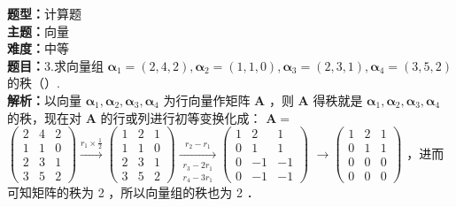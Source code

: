 \documentclass{ctexart}
\newenvironment{question}[5]{%
	\noindent\textbf{题型：}#1\\
	\textbf{主题：}#2\\
	\textbf{难度：}#3\\
	\textbf{题目：}#4\\
	\textbf{解析：}#5\\
	\vspace{1em}
}{}
\begin{document}
	\begin{question}
		{计算题}
		{向量}
		{中等}
		{3.求向量组 \(\boldsymbol{\alpha}_1=(2,4,2), \boldsymbol{\alpha}_2=(1,1,0), \boldsymbol{\alpha}_3=(2,3,1), \boldsymbol{\alpha}_4=(3,5,2)\) 的秩（）. }
		{以向量 \(\boldsymbol{\alpha}_1, \boldsymbol{\alpha}_2, \boldsymbol{\alpha}_3, \boldsymbol{\alpha}_4\) 为行向量作矩阵 \(\mathbf{A}\) ，则 \(\mathbf{A}\) 得秩就是 \(\boldsymbol{\alpha}_1, \boldsymbol{\alpha}_2, \boldsymbol{\alpha}_3, \boldsymbol{\alpha}_4\) 的秩，现在对 \(\mathbf{A}\) 的行或列进行初等变换化成： \(\mathbf{A}=\) \(\left(\begin{array}{lll}2 & 4 & 2 \\ 1 & 1 & 0 \\ 2 & 3 & 1 \\ 3 & 5 & 2\end{array}\right) \xrightarrow{r_1 \times \frac{1}{2}}\left(\begin{array}{lll}1 & 2 & 1 \\ 1 & 1 & 0 \\ 2 & 3 & 1 \\ 3 & 5 & 2\end{array}\right) \xrightarrow[\substack{r_3-2 r_1 \\ r_4-3 r_1}]{r_2-r_1}\left(\begin{array}{ccc}1 & 2 & 1 \\ 0 & 1 & 1 \\ 0 & -1 & -1 \\ 0 & -1 & -1\end{array}\right)\) \(\rightarrow\left(\begin{array}{lll}1 & 2 & 1 \\ 0 & 1 & 1 \\ 0 & 0 & 0 \\ 0 & 0 & 0\end{array}\right)\) ，进而可知矩阵的秩为 2 ，所以向量组的秩也为 2 ．}
	\end{question}
	
\end{document}
